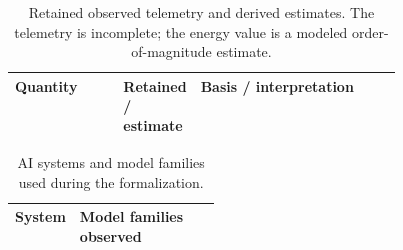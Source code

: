\begin{table}[H]
\centering
\scriptsize
\caption{Retained observed telemetry and derived estimates.  The telemetry is incomplete; the energy value is a modeled order-of-magnitude estimate.}
\begin{tabularx}{\linewidth}{@{}p{0.28\linewidth}p{0.17\linewidth}>{\raggedright\arraybackslash}X@{}}
\toprule
Quantity & Retained / estimate & Basis / interpretation \\
\midrule

\end{tabularx}
\end{table}


\begin{table}[H]
\centering
\scriptsize
\caption{AI systems and model families used during the formalization.}
\label{tab:formalization-systems}
\begin{tabularx}{\linewidth}{@{}p{0.24\linewidth}>{\raggedright\arraybackslash}X@{}}
\toprule
System & Model families observed \\
\midrule

\end{tabularx}
\end{table}

\begin{table}[H]
\centering
\scriptsize
\caption{Recovered model-resolved token measurements.  These are retained measurements for the model labels with
recovered telemetry; models in \cref{tab:formalization-systems} that do not
appear here were still used.}
\label{tab:model-tokens-appendix}
\resizebox{\linewidth}{!}{}
\end{table}

